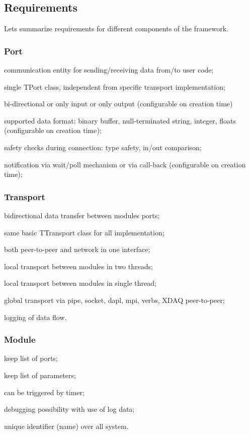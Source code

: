 \subsection{Requirements}
Lets summarize requirements for different components of the framework.
\subsubsection{Port}
\begin{compactitem}[$\bullet$]
\item communication entity for sending/receiving data from/to user code;
\item single TPort class, independent from specific transport implementation;
\item bi-directional or only input or only output (configurable on creation time)
\item supported data format: binary buffer, null-terminated string, integer, floats (configurable on creation time);
\item safety checks during connection: type safety, in/out comparison;
\item notification via wait/poll mechanism or via call-back (configurable on creation time);
\end{compactitem}
\subsubsection{Transport}
\begin{compactitem}[$\bullet$]
\item bidirectional data transfer between modules ports;
\item same basic TTransport class for all implementation;
\item both peer-to-peer and network in one interface;
\item local transport between modules in two threads;
\item local transport between modules in single thread;
\item global transport via pipe, socket, dapl, mpi, verbs, XDAQ peer-to-peer;
\item logging of data flow. 
\end{compactitem}
\subsubsection{Module}
\begin{compactitem}[$\bullet$]
\item keep list of ports;
\item keep list of parameters;
\item can be triggered by timer;
\item debugging possibility with use of log data;
\item unique identifier (name) over all system.
\end{compactitem}
